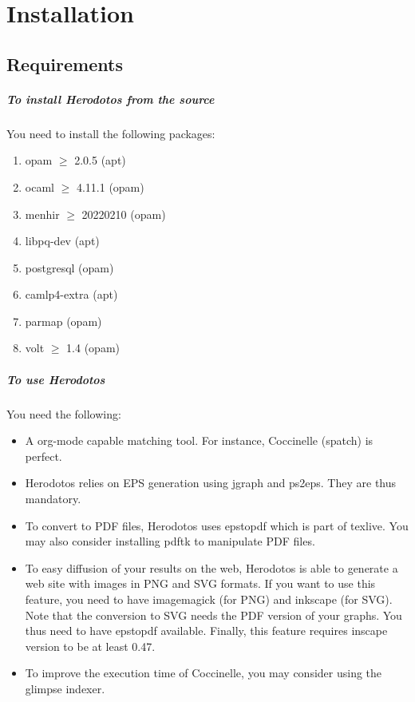 
\chapter{Installation}
\label{sec:install}

\section{Requirements}
\label{sec:requirements}

\paragraph{To install Herodotos from the source}

You need to install the following packages:
\begin{enumerate}
\item opam $\geq$ 2.0.5 (apt)
\item ocaml $\geq$ 4.11.1 (opam)
\item menhir $\geq$ 20220210 (opam)
\item libpq-dev (apt)
\item postgresql (opam)
\item camlp4-extra (apt)
\item parmap (opam)
\item volt $\geq$ 1.4 (opam)
\end{enumerate}

\paragraph{To use Herodotos}

You need the following:

\begin{itemize}
\item A org-mode capable matching tool. For instance, Coccinelle
  (spatch) is perfect.

\item Herodotos relies on EPS generation using jgraph and ps2eps. They
  are thus mandatory.
\item To convert to PDF files, Herodotos uses epstopdf which is part
  of texlive. You may also consider installing pdftk to manipulate
  PDF files.
\item To easy diffusion of your results on the web, Herodotos is able
  to generate a web site with images in PNG and SVG formats. If you
  want to use this feature, you need to have imagemagick (for PNG) and
  inkscape (for SVG). Note that the conversion to SVG needs the PDF
  version of your graphs. You thus need to have epstopdf
  available. Finally, this feature requires inscape version to be at
  least 0.47.
\item To improve the execution time of Coccinelle, you may consider
  using the glimpse indexer.
\end{itemize}

